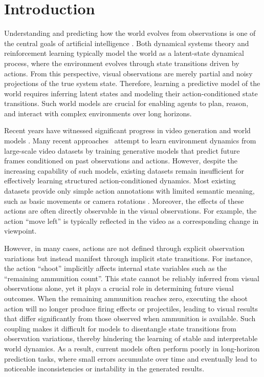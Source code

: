 \section{Introduction}
Understanding and predicting how the world evolves from observations is one of the central goals of artificial intelligence \cite{schmidhuber2015learning,ha2018world,kim2020active}.
Both dynamical systems theory \cite{bertsekas2012dynamic,hafner2023mastering} and reinforcement learning \cite{sutton2018reinforcement} typically model the world as a latent-state dynamical process, where the environment evolves through state transitions driven by actions. From this perspective, visual observations are merely partial and noisy projections of the true system state.
Therefore, learning a predictive model of the world requires inferring latent states and modeling their action-conditioned state transitions.
Such world models are crucial for enabling agents to plan, reason, and interact with complex environments over long horizons.


Recent years have witnessed significant progress in video generation and world models \cite{wan2025wan,hacohen2026ltx,team2026advancing}.
Many recent approaches~\cite{matrixgame2,ji2025memflow,yume1_5} attempt to learn environment dynamics from large-scale video datasets by training generative models that predict future frames conditioned on past observations and actions.
However, despite the increasing capability of such models, existing datasets remain insufficient for effectively learning structured action-conditioned dynamics.
Most existing datasets provide only simple action annotations with limited semantic meaning, such as basic movements or camera rotations \cite{sekai,spatialvid}.
Moreover, the effects of these actions are often directly observable in the visual observations.
For example, the action “move left” is typically reflected in the video as a corresponding change in viewpoint.

However, in many cases, actions are not defined through explicit observation variations but instead manifest through implicit state transitions.
For instance, the action ``shoot'' implicitly affects internal state variables such as the ``remaining ammunition count''.
This state cannot be reliably inferred from visual observations alone, yet it plays a crucial role in determining future visual outcomes.
When the remaining ammunition reaches zero, executing the shoot action will no longer produce firing effects or projectiles, leading to visual results that differ significantly from those observed when ammunition is available.
Such coupling makes it difficult for models to disentangle state transitions from observation variations, thereby hindering the learning of stable and interpretable world dynamics.
As a result, current models often perform poorly in long-horizon prediction tasks, where small errors accumulate over time and eventually lead to noticeable inconsistencies or instability in the generated results.

